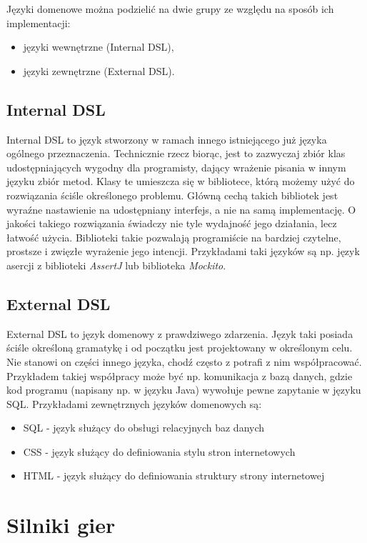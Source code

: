 \documentclass[openright]{xmgr}
\begin{document}
Języki domenowe można podzielić na dwie grupy ze względu na sposób ich implementacji:
\begin{itemize}
\item języki wewnętrzne (Internal DSL),
\item języki zewnętrzne (External DSL).
\end{itemize}

\subsection{Internal DSL}

Internal DSL to język stworzony w ramach innego istniejącego już języka ogólnego przeznaczenia. Technicznie rzecz biorąc, jest to zazwyczaj zbiór klas udostępniających wygodny dla programisty, dający wrażenie pisania w innym języku zbiór metod. Klasy te umieszcza się w bibliotece, którą możemy użyć do rozwiązania ściśle określonego problemu. Główną cechą takich bibliotek jest wyraźne nastawienie na udostępniany interfejs, a nie na samą implementację. O jakości takiego rozwiązania świadczy nie tyle wydajność jego działania, lecz łatwość użycia. Biblioteki takie pozwalają programiście na bardziej czytelne, prostsze i zwięzłe wyrażenie jego intencji. Przykładami taki języków są np. język asercji z biblioteki \textit{AssertJ} lub  biblioteka \textit{Mockito}. 

\subsection{External DSL}

External DSL to język domenowy z prawdziwego zdarzenia. Język taki posiada ściśle określoną gramatykę i od początku jest projektowany w określonym celu. Nie stanowi on części innego języka, chodź często z potrafi z nim współpracować. Przykładem takiej współpracy może być np. komunikacja z bazą danych, gdzie kod programu (napisany np. w języku Java) wywołuje pewne zapytanie w języku SQL. Przykładami zewnętrznych języków domenowych są:
\begin{itemize}
	\item SQL - język służący do obsługi relacyjnych baz danych
	\item CSS - język służący do definiowania stylu stron internetowych 
	\item HTML - język służący do definiowania struktury strony internetowej
\end{itemize}

\section{Silniki gier}
\end{document}
